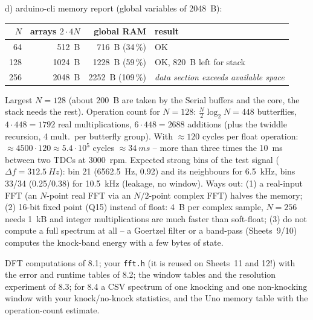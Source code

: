\begin{solution}
d) arduino-cli memory report (global variables of \SI{2048}{B}):
\begin{center}\small
\begin{tabular}{rrrl}
\toprule
$N$ & arrays $2\cdot4N$ & global RAM & result\\
\midrule
64 & \SI{512}{B} & \SI{716}{B} (34\,\%) & OK\\
128 & \SI{1024}{B} & \SI{1228}{B} (59\,\%) & OK, \SI{820}{B} left for stack\\
256 & \SI{2048}{B} & \SI{2252}{B} (109\,\%) & \emph{data section exceeds available space}\\
\bottomrule
\end{tabular}
\end{center}
Largest $N=128$ (about \SI{200}{B} are taken by the Serial buffers and the core,
the stack needs the rest). Operation count for $N=128$: $\frac N2\log_2N=448$
butterflies, $4\cdot448=1792$ real multiplications, $6\cdot448=2688$ additions
(plus the twiddle recursion, 4 mult.\ per butterfly group). With
$\approx120$ cycles per float operation: $\approx4500\cdot120\approx5.4\cdot10^5$
cycles $\approx\SI{34}{ms}$ -- more than three times the \SI{10}{ms} between two
TDCs at \SI{3000}{rpm}. Expected strong bins of the test signal
($\Delta f=\SI{312.5}{Hz}$): bin 21 (\SI{6562.5}{Hz}, 0.92) and its neighbours
for \SI{6.5}{kHz}, bins 33/34 (0.25/0.38) for \SI{10.5}{kHz} (leakage, no window).
Ways out: (1) a real-input FFT (an $N$-point real FFT via an $N/2$-point complex
FFT) halves the memory; (2) 16-bit fixed point (Q15) instead of float:
\SI{4}{B} per complex sample, $N=256$ needs \SI{1}{kB} and integer
multiplications are much faster than soft-float; (3) do not compute a full
spectrum at all -- a Goertzel filter or a band-pass (Sheets~9/10) computes the
knock-band energy with a few bytes of state.
\end{solution}

\begin{deliverables}
DFT computations of 8.1; your \texttt{fft.h} (it is reused on Sheets~11 and
12!) with the error and runtime tables of 8.2; the window tables and the
resolution experiment of 8.3; for 8.4 a CSV spectrum of one knocking and one
non-knocking window with your knock/no-knock statistics, and the Uno memory
table with the operation-count estimate.
\end{deliverables}
